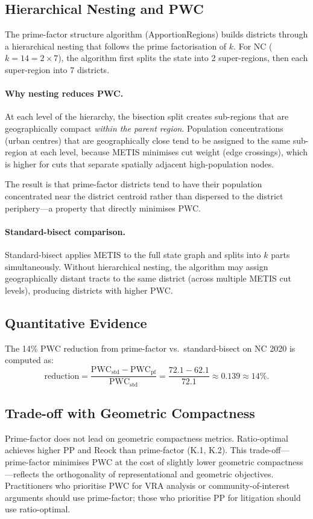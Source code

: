 \subsection{Hierarchical Nesting and PWC}

The prime-factor structure algorithm (ApportionRegions) builds districts
through a hierarchical nesting that follows the prime factorisation of $k$.
For NC ($k = 14 = 2 \times 7$), the algorithm first splits the state into
2 super-regions, then each super-region into 7 districts.

\paragraph{Why nesting reduces PWC.}
At each level of the hierarchy, the bisection split creates sub-regions that
are geographically compact \emph{within the parent region}.
Population concentrations (urban centres) that are geographically close
tend to be assigned to the same sub-region at each level, because METIS
minimises cut weight (edge crossings), which is higher for cuts that separate
spatially adjacent high-population nodes.

The result is that prime-factor districts tend to have their population
concentrated near the district centroid rather than dispersed to the
district periphery---a property that directly minimises PWC.

\paragraph{Standard-bisect comparison.}
Standard-bisect applies METIS to the full state graph and splits into $k$ parts
simultaneously.
Without hierarchical nesting, the algorithm may assign geographically distant
tracts to the same district (across multiple METIS cut levels), producing districts
with higher PWC.

\subsection{Quantitative Evidence}

The 14\% PWC reduction from prime-factor vs.\ standard-bisect on NC 2020
is computed as:
\[
  \text{reduction} = \frac{\text{PWC}_{\text{std}} - \text{PWC}_{\text{pf}}}{\text{PWC}_{\text{std}}}
  = \frac{72.1 - 62.1}{72.1} \approx 0.139 \approx 14\%.
\]

\subsection{Trade-off with Geometric Compactness}

Prime-factor does not lead on geometric compactness metrics.
Ratio-optimal achieves higher PP and Reock than prime-factor (K.1, K.2).
This trade-off---prime-factor minimises PWC at the cost of slightly lower geometric
compactness---reflects the orthogonality of representational and geometric objectives.
Practitioners who prioritise PWC for VRA analysis or community-of-interest
arguments should use prime-factor; those who prioritise PP for litigation
should use ratio-optimal.
